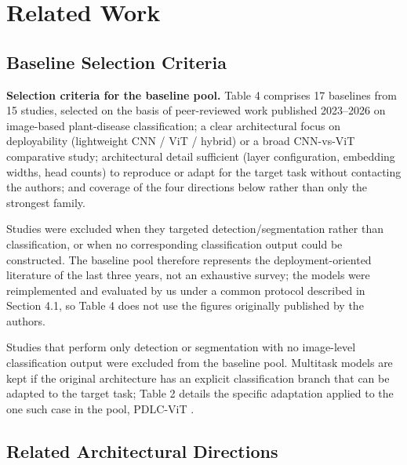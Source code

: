 \FloatBarrier

\section{Related Work}\label{related-work}

\subsection{Baseline Selection Criteria}\label{baseline-selection-criteria}

\textbf{Selection criteria for the baseline pool.} Table 4 comprises 17 baselines from 15 studies, selected on the basis of peer-reviewed work published 2023--2026 on image-based plant-disease classification; a clear architectural focus on deployability (lightweight CNN / ViT / hybrid) or a broad CNN-vs-ViT comparative study; architectural detail sufficient (layer configuration, embedding widths, head counts) to reproduce or adapt for the target task without contacting the authors; and coverage of the four directions below rather than only the strongest family.

Studies were excluded when they targeted detection/segmentation rather than classification, or when no corresponding classification output could be constructed. The baseline pool therefore represents the deployment-oriented literature of the last three years, not an exhaustive survey; the models were reimplemented and evaluated by us under a common protocol described in Section 4.1, so Table 4 does not use the figures originally published by the authors.

Studies that perform only detection or segmentation with no image-level classification output were excluded from the baseline pool. Multitask models are kept if the original architecture has an explicit classification branch that can be adapted to the target task; Table 2 details the specific adaptation applied to the one such case in the pool, PDLC-ViT \cite{hemalatha2024}.

\subsection{Related Architectural Directions}\label{related-architectural-directions}


